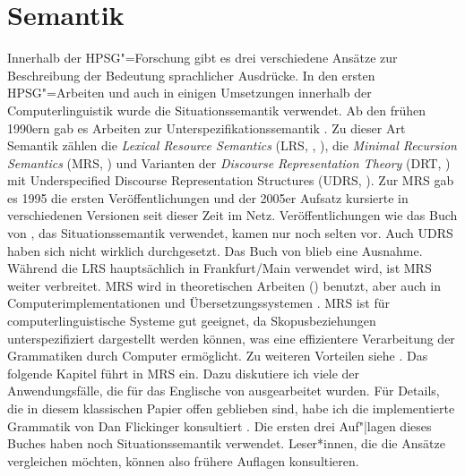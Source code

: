 
\chapter{Semantik}
\label{chap-sem}\label{Kapitel-Semantik}


Innerhalb der HPSG"=Forschung gibt es drei verschiedene Ansätze
zur Beschreibung der Bedeutung sprachlicher Ausdrücke. In den ersten
HPSG"=Arbeiten \citep{ps,ps2,Kiss95a,Mueller99a} und auch in einigen Umsetzungen 
innerhalb der Computerlinguistik \citep{MuellerBabel} wurde die Situationssemantik
\citep*{BP83a,CMP90,Devlin92}\nocite{BP87a} verwendet. Ab den frühen 1990ern gab es Arbeiten zur Unterspezifikationssemantik
\citep{Nerbonne93a}. Zu dieser Art Semantik zählen die \emph{Lexical Resource Semantics} (LRS,
\citealt{RS2004a-u,IR2015a-u,Richter2016a-u,SailerRichter2021a-u}, \citealt[Section~6.2]{KR2024a}), die \emph{Minimal Recursion Semantics}
(MRS, \citealt*{CFPS2005a}) und Varianten der \emph{Discourse Representation Theory} (DRT, \citealt{KR93a}) mit Underspecified
Discourse Representation Structures (UDRS, \citealt{FR95a-u}). Zur MRS gab es 1995 die ersten Veröffentlichungen \citep{CFMRS95a-u} und
der 2005er Aufsatz kursierte
in verschiedenen Versionen seit dieser Zeit im Netz. Veröffentlichungen wie das Buch von
\citet{GSag2000a-u}, das Situationssemantik verwendet, kamen nur noch selten vor. Auch UDRS haben
sich nicht wirklich durchgesetzt. Das Buch von \citet{Holler2005a-u} blieb eine Ausnahme.
Während die LRS hauptsächlich in Frankfurt/Main verwendet wird, ist MRS
weiter verbreitet. MRS wird in theoretischen Arbeiten (\zb \citealt{Kiss2001a}) benutzt, aber auch in
Computerimplementationen und Übersetzungssystemen \citep*{FCS2000a,MK2000a,Siegel2000a,BFO2002a-u,MuellerCoreGram}. MRS ist für computerlinguistische Systeme gut geeignet, da
Skopusbeziehungen unterspezifiziert dargestellt werden können, was eine effizientere
Verarbeitung der Grammatiken durch Computer ermöglicht. Zu weiteren Vorteilen siehe \citep*[Abschnitt~2]{CFPS2005a}.
Das folgende Kapitel führt in MRS ein. Dazu diskutiere ich viele der Anwendungsfälle, die für das
Englische von \citet*{CFPS2005a} ausgearbeitet wurden. Für Details, die in diesem klassischen Papier
offen geblieben sind, habe ich die implementierte Grammatik von Dan Flickinger konsultiert
\parencites{Flickinger2000a,FCS2000a}. Die ersten drei Auf"|lagen dieses Buches haben noch
Situationssemantik verwendet. Leser*innen, die die Ansätze vergleichen möchten, können also frühere
Auflagen konsultieren.

